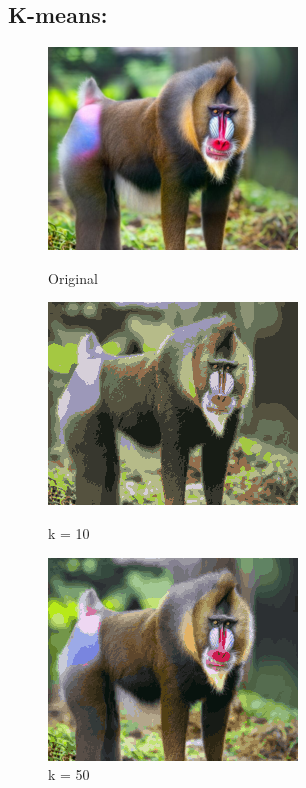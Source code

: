 \documentclass[12pt]{article}
\begin{document}
\subsection*{K-means:}
    \begin{figure}[!h]
        \begin{minipage}{0.5\textwidth}
        \centering
        \includegraphics[]{images/monkey_compressed}
        \caption{Original}
        \end{minipage}
        \begin{minipage}{0.5\textwidth}
        \centering
        \includegraphics[]{images/monkey_clustered_kmeans_k_10}
        \caption{k = 10}
        \end{minipage}
        \begin{minipage}{0.5\textwidth}
        \centering
        \includegraphics[]{images/monkey_clustered_kmeans_k_50}
        \caption{k = 50}
        \end{minipage}

\end{figure}
\end{document}
